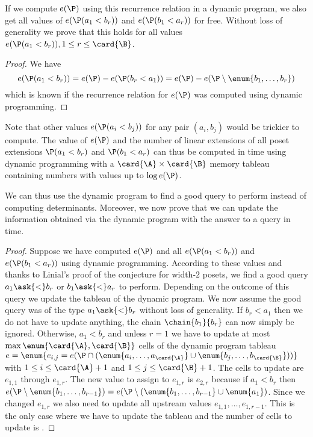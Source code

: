 If we compute \(e(\P)\) using this recurrence relation in a dynamic program,
we also get all values of \(e(\P(a_1 < b_r))\) and \(e(\P(b_1 < a_r))\) for
free. Without loss of generality we prove that this holds for all
values \(e(\P(a_1 < b_r)), 1 \le r \le \card{\B}\).
\begin{proof}
We have
\begin{displaymath}
e(\P(a_1 < b_r)) = e(\P) - e(\P(b_r < a_1)) = e(\P) - e(\P \setminus \enum{b_1,\ldots,b_r})
\end{displaymath}
which is known if the recurrence relation for \(e(\P)\) was computed using dynamic
programming.
\end{proof}
Note that other values \(e(\P(a_i < b_j))\) for any pair \((a_i,b_j)\)
would be trickier to compute. The value of \(e(\P)\) and the number of linear
extensions of all poset extensions \(\P(a_1 < b_r)\) and \(\P(b_1 < a_r)\) can
thus be computed in  time using dynamic programming with a
\(\card{\A} \times \card{\B}\) memory tableau containing numbers with values up to \(\log
e(\P)\).

We can thus use the dynamic program to find a good query to perform instead of
computing determinants.
Moreover, we now prove that we can update the information obtained via the dynamic program
with the answer to a query in  time.
\begin{proof}
Suppose we have computed \(e(\P)\) and all \(e(\P(a_1 < b_r))\) and
\(e(\P(b_1 < a_r))\) using dynamic programming. According to these values and
thanks to Linial's proof of the \onethirdtwothird conjecture for width-\(2\)
posets, we find a good query \(a_1 \ask{<} b_r\) or \(b_1 \ask{<} a_r\) to perform.
Depending on the outcome of this query we update the tableau of the dynamic
program. We now assume the good query was of the type \(a_1 \ask{<} b_r\)
without loss of generality. If \(b_r < a_1\) then we do not have to update anything,
the chain \(\chain{b_1}{b_r}\) can now simply be ignored. Otherwise, \(a_1 <
b_r\) and
unless \(r = 1\) we have to update at most \(\max\enum{\card{\A}, \card{\B}}\) cells of the dynamic program
tableau \(e = \enum{e_{i,j} = e(\P \cap (\enum{a_i,\ldots,a_{\card{\A}}} \cup
\enum{b_j,\ldots,b_{\card{\B}}}))}\) with \(1 \le i \le \card{\A}+1\) and \(1 \le j
\le \card{\B}+1\). The
cells to update are \(e_{1,1}\) through \(e_{1,r}\). The
new value to assign to \(e_{1,r}\) is \(e_{2,r}\) because if \(a_1 < b_r\)
then \(e(\P \setminus
\enum{b_1,\ldots,b_{r-1}}) = e(\P \setminus (\enum{b_1,\ldots,b_{r-1}} \cup
\enum{a_1})\). Since we changed \(e_{1,r}\) we also need to update all upstream
values \(e_{1,1}, \ldots, e_{1,r-1}\). This is the only case where we have to
update the tableau and the number of cells to update is .
\end{proof}

